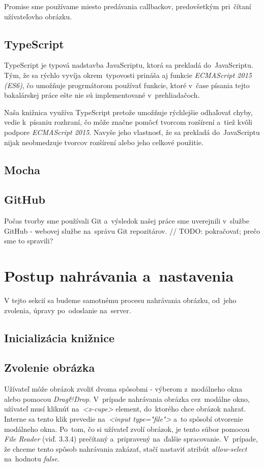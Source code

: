 Promise sme používame miesto predávania callbackov, predovšetkým pri~čítaní užívateľovho obrázku.

\subsection{TypeScript}

TypeScript je typová nadstavba JavaScriptu, ktorá sa prekladá do~JavaScriptu. Tým, že sa rýchlo vyvíja okrem~typovosti prináša aj funkcie \emph{ECMAScript 2015 (ES6)}, čo umožňuje progrmátorom používať funkcie, ktoré v~čase písania tejto bakalárskej práce ešte nie sú implementované v~prehliadačoch.

Naša knižnica využíva TypeScript pretože umožňuje rýchlejšie odhaľovať chyby, vedie k~písaniu rozhraní, čo môže značne pomôcť tvorcom rozšírení a~tiež kvôli podpore \emph{ECMAScript 2015}. Navyše jeho vlastnosť, že sa prekladá do~JavaScriptu nijak neobmedzuje tvorcov rozšírení alebo jeho celkové použitie.

\subsection{Mocha}
\subsection{GitHub}

Počas tvorby sme používali Git a~výsledok našej práce sme uverejnili v~službe GitHub - webovej službe na~správu Git repozitárov. // TODO: pokračovať; prečo sme to spravili?


\section{Postup nahrávania a~nastavenia}

V tejto sekcií sa budeme samotnému procesu nahrávania obrázku, od~jeho zvolenia, úpravy po~odoslanie na~server.


\subsection{Inicializácia knižnice}
\subsection{Zvolenie obrázka}

Užívateľ môže obrázok zvoliť dvoma spôsobmi - výberom z~modálneho okna alebo pomocou \emph{Drag&Drop}. V~prípade nahrávania obrázka cez~modálne okno, užívateľ musí kliknúť na~\emph{<x-cupe>} element, do~ktorého chce obrázok nahrať. Interne sa tento klik prevedie na~\emph{<input type="file"\textgreater} a~to spôsobí otvorenie modálneho okna. Po~tom, čo si užívateľ zvolí obrázok, je tento súbor pomocou \emph{File Reader} (viď. 3.3.4) prečítaný a~pripravený na~ďalšie spracovanie. V~prípade, že chceme tento spôsob nahrávania zakázať, stačí nastaviť atribút \emph{allow-select} na~hodnotu \emph{false}.

